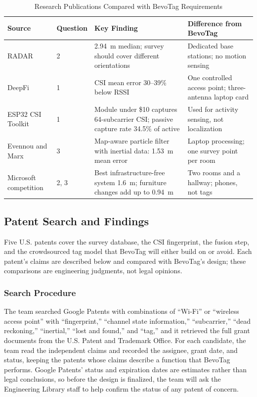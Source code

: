 \documentclass[12pt,letterpaper]{article}
\newenvironment{spectable}{\setstretch{1.0}\renewcommand{\arraystretch}{1.1}}{}
\begin{document}
\begin{table}[!htb]
\caption{Research Publications Compared with BevoTag Requirements}
\label{tab:art}
\centering
\begin{spectable}
\begin{tabularx}{\linewidth}{@{}L{1.25in} L{0.75in} Y Y@{}}
\toprule
\textbf{Source} & \textbf{Question} & \textbf{Key Finding} & \textbf{Difference from BevoTag} \\
\midrule
RADAR \cite{radar} & 2 & 2.94~m median; survey should cover different orientations & Dedicated base stations; no motion sensing \\ \addlinespace
DeepFi \cite{deepfi} & 1 & CSI mean error 30--39\% below RSSI & One controlled access point; three-antenna laptop card \\ \addlinespace
ESP32 CSI Toolkit \cite{esp32tool} & 1 & Module under \$10 captures 64-subcarrier CSI; passive capture rate 34.5\% of active & Used for activity sensing, not localization \\ \addlinespace
Evennou and Marx \cite{evennou} & 3 & Map-aware particle filter with inertial data: 1.53~m mean error & Laptop processing; one survey point per room \\ \addlinespace
Microsoft competition \cite{msilc} & 2, 3 & Best infrastructure-free system 1.6~m; furniture changes add up to 0.94~m & Two rooms and a hallway; phones, not tags \\
\bottomrule
\end{tabularx}
\end{spectable}
\end{table}

\subsection{Patent Search and Findings}
Five U.S. patents cover the survey database, the CSI fingerprint, the fusion step, and the
crowdsourced tag model that BevoTag will either build on or avoid. Each patent's claims are
described below and compared with BevoTag's design; these comparisons are engineering judgments,
not legal opinions.

\subsubsection{Search Procedure}
The team searched Google Patents with combinations of ``Wi-Fi'' or ``wireless access point'' with
``fingerprint,'' ``channel state information,'' ``subcarrier,'' ``dead reckoning,'' ``inertial,''
``lost and found,'' and ``tag,'' and it retrieved the full grant documents from the U.S. Patent
and Trademark Office. For each candidate, the team read the independent claims and recorded the
assignee, grant date, and status, keeping the patents whose claims describe a function that
BevoTag performs. Google Patents' status and expiration dates are estimates rather than legal
conclusions, so before the design is finalized, the team will ask the Engineering Library staff to
help confirm the status of any patent of concern.
\end{document}
